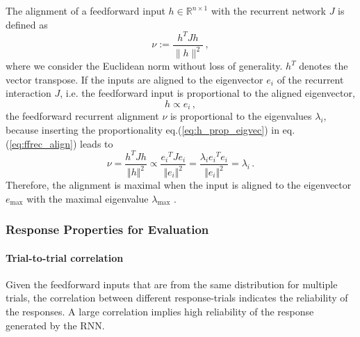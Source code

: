 \documentclass[11pt]{article}
\begin{document}
	The alignment of a feedforward input $h \in \mathbb{R}^{n \times 1}$ with the recurrent network $J$ is defined as \cite{tragenap2023nature}
		\begin{equation} \label{eq:ffrec_align}
			\nu := \frac{h^T J h}{\parallel h \parallel ^2}\, ,
		\end{equation}	
	where we consider the Euclidean norm without loss of generality. $h^T$ denotes the vector transpose. 
	If the inputs are aligned to the eigenvector $e_i$ of the recurrent interaction $J$, i.e. the feedforward input is proportional to the aligned eigenvector, 
		\begin{equation} \label{eq:h_prop_eigvec}
			h \propto e_i  \, ,
		\end{equation}
	the feedforward recurrent alignment $\nu$ is proportional to the eigenvalues $\lambda_i$, because inserting the proportionality eq.(\ref{eq:h_prop_eigvec}) in eq.(\ref{eq:ffrec_align}) leads to
		\begin{equation} \label{eq:ffrec_equals_eigval}
			\nu = \frac{h^T J h}{\Vert h \Vert ^2} \propto \frac{{e_i}^T J e_i}{\Vert e_i \Vert^2} = \frac{\lambda_i {e_i}^T e_i}{\Vert e_i \Vert ^2} = \lambda_i \, .
		\end{equation}
	Therefore, the alignment is maximal when the input is aligned to the eigenvector $e_{\text{max}}$ with the maximal eigenvalue $\lambda_{\text{max}}$ \cite{tragenap2023nature}. 
	
	\subsubsection{Response Properties for Evaluation} \label{sec:response_properties_for_evaluation}
	\paragraph{Trial-to-trial correlation} \label{para:ttc_sym}
	Given the feedforward inputs that are from the same distribution for multiple trials, the correlation between different response-trials indicates the reliability of the responses. A large correlation implies high reliability of the response generated by the RNN. 
	
\end{document}
